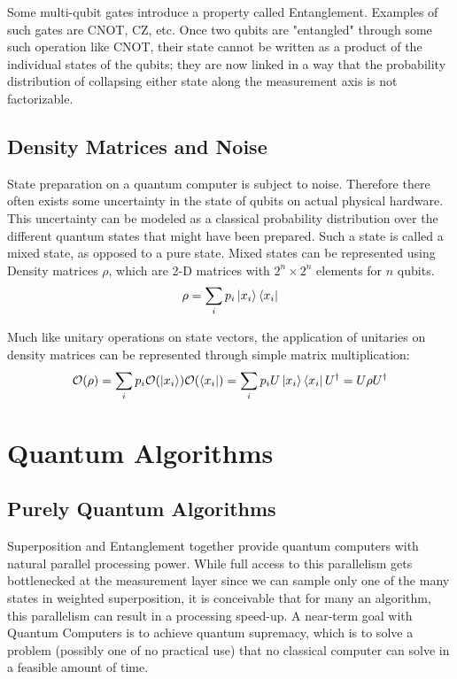 Some multi-qubit gates introduce a property called Entanglement. Examples of such gates are CNOT, CZ, etc. Once two qubits are "entangled" through some such operation like CNOT, their state cannot be written as a product of the individual states of the qubits; they are now linked in a way that the probability distribution of collapsing either state along the measurement axis is not factorizable. 


\subsection{Density Matrices and Noise}

State preparation on a quantum computer is subject to noise. Therefore there often exists some uncertainty in the state of qubits on actual physical hardware. This uncertainty can be modeled as a classical probability distribution over the different quantum states that might have been prepared. Such a state is called a mixed state, as opposed to a pure state. Mixed states can be represented using Density matrices $\rho$, which are 2-D matrices with $2^n \times 2^n$ elements for $n$ qubits.
\begin{equation}
    \rho = \sum_{i} p_i \ket{x_i} \bra{x_i}
\end{equation}

Much like unitary operations on state vectors, the application of unitaries on density matrices can be represented through simple matrix multiplication:
\begin{equation}
    \mathcal{O} (\rho) = \sum_i p_i \mathcal{O}(\ket{x_i}) \mathcal{O}(\bra{x_i}) = \sum_i p_i U \ket{x_i} \bra{x_i} U^\dagger = U \rho U^\dagger
\end{equation}


\section{Quantum Algorithms}
\label{sec:quantum-algorithms}

\subsection{Purely Quantum Algorithms}

Superposition and Entanglement together provide quantum computers with natural parallel processing power. While full access to this parallelism gets bottlenecked at the measurement layer since we can sample only one of the many states in weighted superposition, it is conceivable that for many an algorithm, this parallelism can result in a processing speed-up. A near-term goal with Quantum Computers is to achieve quantum supremacy, which is to solve a problem (possibly one of no practical use) that no classical computer can solve in a feasible amount of time. \cite{quantum-complexity-survey}


